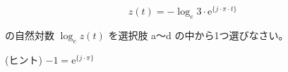 \[
z(t) = -\log_e 3 \cdot \textrm{e}^{\{j \cdot \pi \cdot t \}}
\]

\bigskip
\noindent の自然対数 $\log_e z(t)$ を選択肢 a〜d の中から1つ選びなさい。 

\bigskip
\noindent (ヒント) $-1 = \textrm{e}^{\{j \cdot \pi\}}$
